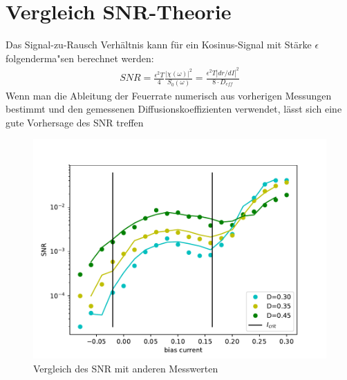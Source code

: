 \documentclass[12pt,a4paper]{article}
\begin{document}

\thispagestyle{empty}
\newpage
\tableofcontents
\thispagestyle{empty}
\newpage
{}

\section{Vergleich SNR-Theorie}
Das Signal-zu-Rausch Verhältnis kann für ein Kosinus-Signal mit Stärke $\epsilon$ folgenderma"sen berechnet werden:
\begin{align*}
SNR=\frac{\epsilon ^2T}{4}\frac{|\chi(\omega)|^2}{S_0(\omega)}=\frac{\epsilon^2T|dr/dI|^2}{8\cdot D_{eff}}
\end{align*}
Wenn man die Ableitung der Feuerrate numerisch aus vorherigen Messungen bestimmt und den gemessenen Diffusionskoeffizienten verwendet, lässt sich eine gute Vorhersage des SNR treffen

\begin{figure}[H]
	\centering
	\includegraphics[scale=0.9]{snrangerealanameassp.pdf}
	\caption{Vergleich des SNR mit anderen Messwerten}
	\label{snrspike}
\end{figure}
\end{document}

